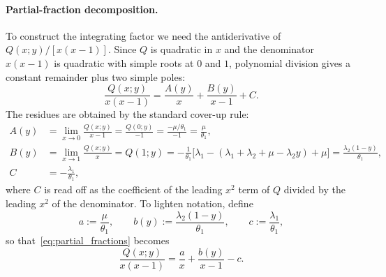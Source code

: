 \paragraph{Partial-fraction decomposition.}
To construct the integrating factor we need the antiderivative of $Q(x;y)/[x(x-1)]$. Since $Q$ is quadratic in $x$ and the denominator $x(x-1)$ is quadratic with simple roots at $0$ and $1$, polynomial division gives a constant remainder plus two simple poles:
\begin{equation}
    \frac{Q(x;y)}{x(x-1)} = \frac{A(y)}{x} + \frac{B(y)}{x-1} + C.
    \label{eq:partial_fractions}
\end{equation}
The residues are obtained by the standard cover-up rule:
\begin{align}
    A(y) &= \lim_{x \to 0} \frac{Q(x;y)}{x-1} = \frac{Q(0;y)}{-1} = \frac{-\mu/\theta_1}{-1} = \frac{\mu}{\theta_1}, \\[2pt]
    B(y) &= \lim_{x \to 1} \frac{Q(x;y)}{x} = Q(1;y) = -\frac{1}{\theta_1}\Big[\lambda_1 - (\lambda_1+\lambda_2+\mu-\lambda_2 y) + \mu\Big] = \frac{\lambda_2(1-y)}{\theta_1}, \\[2pt]
    C &= -\frac{\lambda_1}{\theta_1},
\end{align}
where $C$ is read off as the coefficient of the leading $x^2$ term of $Q$ divided by the leading $x^2$ of the denominator. To lighten notation, define
\begin{equation}
    a := \frac{\mu}{\theta_1}, \qquad b(y) := \frac{\lambda_2(1-y)}{\theta_1}, \qquad c := \frac{\lambda_1}{\theta_1},
    \label{eq:abc_def}
\end{equation}
so that~\eqref{eq:partial_fractions} becomes
\begin{equation}
    \frac{Q(x;y)}{x(x-1)} = \frac{a}{x} + \frac{b(y)}{x-1} - c.
\end{equation}


